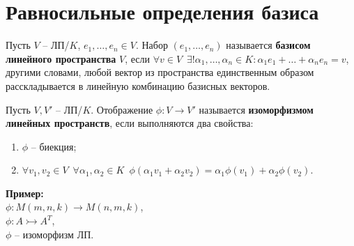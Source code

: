 
\section{Равносильные определения базиса}

\begin{conj}
    Пусть $V$ -- ЛП/$K$, $e_1, \dots, e_n \in V$.
    Набор $(e_1, \dots, e_n)$ называется \textbf{базисом линейного 
    пространства} $V$, если $\forall v \in V \,\,\, \exists! \alpha_1,
    \dots, \alpha_n \in K : \alpha_1 e_1 + \dots + \alpha_n e_n = v$,
    другими словами, любой вектор из пространства единственным образом
    расскладывается в линейную комбинацию базисных векторов.
\end{conj}

\begin{conj}
    Пусть $V, V'$ -- ЛП/$K$. Отображение $\phi : V \rightarrow V'$
    называется \textbf{изоморфизмом линейных пространств}, если
    выполняются два свойства:
    \begin{enumerate}
        \item $\phi$ -- биекция;
        \item $\forall v_1, v_2 \in V \,\,\, \forall \alpha_1, \alpha_2
        \in K \,\,\, \phi(\alpha_1 v_1 + \alpha_2 v_2) = \alpha_1
        \phi (v_1) + \alpha_2 \phi(v_2)$.
    \end{enumerate}
\end{conj}

$ $\\
\textbf{Пример:}\\
$\phi : M(m, n, k) \rightarrow M(n, m, k)$,\\
$\phi : A \rightarrowtail A^T$, \\
$\phi$ -- изоморфизм ЛП.

